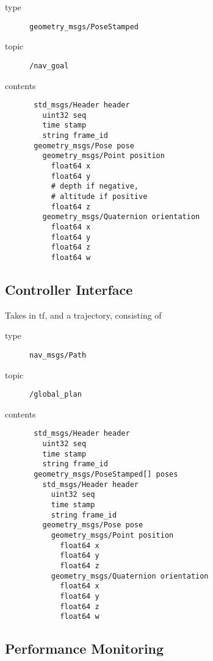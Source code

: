 \documentclass[9pt,technote]{IEEEtran} %
\begin{document}
\begin{description}
\item[type] \texttt{geometry\_msgs/PoseStamped}
\item[topic] \texttt{/nav\_goal}
\item[contents] \begin{scriptsize}
\begin{verbatim}
 std_msgs/Header header
   uint32 seq
   time stamp
   string frame_id
 geometry_msgs/Pose pose
   geometry_msgs/Point position
     float64 x
     float64 y
     # depth if negative,
     # altitude if positive
     float64 z 
   geometry_msgs/Quaternion orientation
     float64 x
     float64 y
     float64 z
     float64 w
\end{verbatim}
\end{scriptsize}
\end{description}


\subsection{Controller Interface}

Takes in tf, and a trajectory, consisting of 

\begin{description}
\item[type] \texttt{nav\_msgs/Path}
\item[topic] \texttt{/global\_plan}
\item[contents] \begin{scriptsize}
\begin{verbatim}
 std_msgs/Header header
   uint32 seq
   time stamp
   string frame_id
 geometry_msgs/PoseStamped[] poses
   std_msgs/Header header
     uint32 seq
     time stamp
     string frame_id
   geometry_msgs/Pose pose
     geometry_msgs/Point position
       float64 x
       float64 y
       float64 z
     geometry_msgs/Quaternion orientation
       float64 x
       float64 y
       float64 z
       float64 w
\end{verbatim}
\end{scriptsize}
\end{description}

\subsection{Performance Monitoring}
\end{document}
